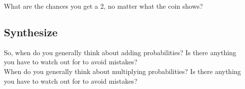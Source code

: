\documentclass[12pt]{amsart}
\theoremstyle{definition}
\begin{document}
What are the chances you get a 2, no matter what the coin shows?\\

\subsection*{Synthesize}
So, when do you generally think about adding probabilities? Is there anything you have to watch out for to avoid mistakes?\\

When do you generally think about multiplying probabilities? Is there anything you have to watch out for to avoid mistakes?\\

\clearpage
\end{document}
